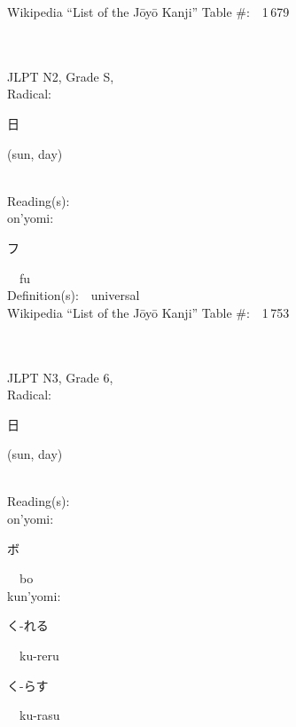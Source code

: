 \begin{multicols}{2}
Wikipedia ``List of the J\=oy\=o Kanji'' Table \#:\ \ 1\,679 \\
\ \ \\
{\fontsize{34pt}{40pt}  }\ \ \\  %
{JLPT N2, Grade S, \\Radical:\ \ {\begin{CJK}{UTF8}{min} 日 \end{CJK}} (sun, day) } \\
Reading(s):\ \ \\
{\hspace*{1em}}on'yomi:\ \ \\
{\hspace*{2em}}{\begin{CJK}{UTF8}{min} フ \end{CJK}}\ \ fu\ \ \\
Definition(s):\ \ universal \\
Wikipedia ``List of the J\=oy\=o Kanji'' Table \#:\ \ 1\,753 \\
\ \ \\
{\fontsize{34pt}{40pt}  }\ \ \\  %
{JLPT N3, Grade 6, \\Radical:\ \ {\begin{CJK}{UTF8}{min} 日 \end{CJK}} (sun, day) } \\
Reading(s):\ \ \\
{\hspace*{1em}}on'yomi:\ \ \\
{\hspace*{2em}}{\begin{CJK}{UTF8}{min} ボ \end{CJK}}\ \ bo\ \ \\
{\hspace*{1em}}kun'yomi:\ \ \\
{\hspace*{2em}}{\begin{CJK}{UTF8}{min} く-れる \end{CJK}}\ \ ku-reru\ \ \\
{\hspace*{2em}}{\begin{CJK}{UTF8}{min} く-らす \end{CJK}}\ \ ku-rasu\ \ \\

\end{multicols}
